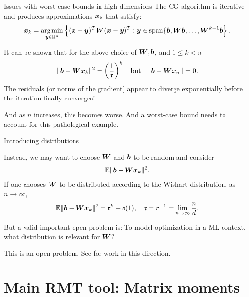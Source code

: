 \documentclass[9pt,aspectratio=169]{beamer}
\begin{document}
\begin{frame}{Issues with worst-case bounds in high dimensions}
  The CG algorithm is iterative and produces approximations ${\boldsymbol x}_k$ that satisfy:
  \begin{align*}
      {\boldsymbol x}_k  = \underset{{\boldsymbol y} \in \mathbb R^n}{\mathrm{arg}\,\mathrm{min}} \left\{  ({\boldsymbol x} - {\boldsymbol y})^T {\boldsymbol W} ({\boldsymbol x} - {\boldsymbol y})^T : {\boldsymbol y} \in \mathrm{span} \{ {\boldsymbol b}, {\boldsymbol W}{\boldsymbol b}, \ldots, {\boldsymbol W}^{k-1} {\boldsymbol b}  \right\}.
  \end{align*}
  \pause
  
  It can be shown that for the above choice of ${\boldsymbol W}, {\boldsymbol b}$, and $1 \leq k < n$
  \begin{align*}
      \|{\boldsymbol b} - {\boldsymbol W} {\boldsymbol x}_k\|^2 = \left( \frac{1}{\mathfrak{r}} \right)^k \quad \text{but} \quad \|{\boldsymbol b} - {\boldsymbol W} {\boldsymbol x}_n\| = 0.
  \end{align*}
    \pause
    The residuals (or norms of the gradient) appear to diverge exponentially before the iteration finally converges!
    
    
    \pause
    And as $n$ increases, this becomes worse.  And a worst-case bound needs to account for this pathological example.
\end{frame}


\begin{frame}{Introducing distributions}

Instead, we may want to choose ${\boldsymbol W}$ and ${\boldsymbol b}$ to be random and consider
\begin{align*}
      \mathbb E\|{\boldsymbol b} - {\boldsymbol W} {\boldsymbol x}_k\|^2.
\end{align*}
If one chooses ${\boldsymbol W}$ to be distributed according to the Wishart distribution, as $n \to \infty$,
\begin{align*}
      \mathbb E\|{\boldsymbol b} - {\boldsymbol W} {\boldsymbol x}_k\|^2 = \mathfrak{r}^k + o(1), \quad \mathfrak r = r^{-1} = \lim_{n\to \infty} \frac{n}{d}.
\end{align*}
\pause

But a valid important open problem is: To model optimization in a ML context, what distribution is relevant for ${\boldsymbol W}$? 


This is an open problem.  See \cite{Liao2021} for work in this direction.


\end{frame}

\section{Main RMT tool:  Matrix moments}
\end{document}
